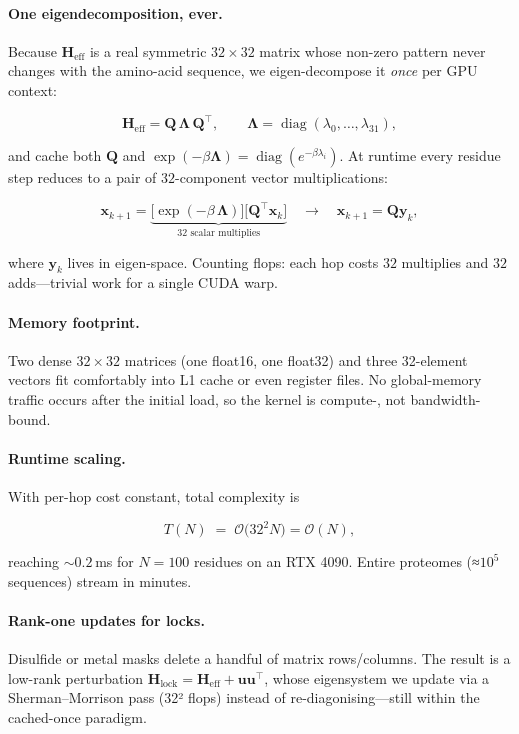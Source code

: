 \documentclass[11pt]{article}
\begin{document}
\paragraph{One eigendecomposition, ever.}
Because $\mathbf H_{\text{eff}}$ is a real symmetric
$32\times32$ matrix whose non-zero pattern never changes with the amino-acid
sequence, we eigen-decompose it \emph{once} per GPU context:

\[
\mathbf H_{\text{eff}}
=
\mathbf Q\,\boldsymbol\Lambda\,\mathbf Q^{\!\top},
\qquad
\boldsymbol\Lambda=\operatorname{diag}(\lambda_{0},\dots,\lambda_{31}),
\]

and cache both $\mathbf Q$ and
$\exp(-\beta\boldsymbol\Lambda)=\operatorname{diag}(e^{-\beta\lambda_{i}})$.
At runtime every residue step reduces to a pair of $32$-component vector
multiplications:

\[
\mathbf x_{k+1}
=
\underbrace{\bigl[\exp(-\beta\,\boldsymbol\Lambda)\bigr]
            \bigl[\mathbf Q^{\!\top}\mathbf x_{k}\bigr]}_{\text{32 scalar multiplies}}
\quad\longrightarrow\quad
\mathbf x_{k+1}=\mathbf Q\mathbf y_{k},
\]

where $\mathbf y_{k}$ lives in eigen-space.  Counting flops: each hop
costs $32$ multiplies and $32$ adds—trivial work for a single CUDA warp.

\paragraph{Memory footprint.}
Two dense $32\times32$ matrices (one float16, one float32) and three
32-element vectors fit comfortably into L1 cache or even register files.
No global-memory traffic occurs after the initial load, so the kernel is
compute-, not bandwidth-bound.

\paragraph{Runtime scaling.}
With per-hop cost constant, total complexity is

\[
T(N)\;=\;\mathcal O\!\bigl(32^{2}N\bigr)=\mathcal O(N),
\]

reaching $\sim0.2$ ms for $N=100$ residues on an RTX 4090.  Entire
proteomes (≈$10^{5}$ sequences) stream in minutes.

\paragraph{Rank-one updates for locks.}
Disulfide or metal masks delete a handful of matrix rows/columns.  The
result is a low-rank perturbation
$\mathbf H_{\text{lock}}=\mathbf H_{\text{eff}}+\mathbf u\mathbf u^{\!\top}$,
whose eigensystem we update via a Sherman–Morrison pass (32² flops)
instead of re-diagonising—still within the cached-once paradigm.
\end{document}
